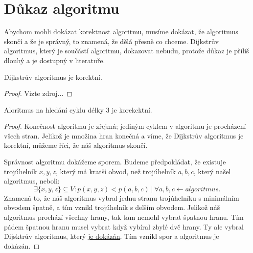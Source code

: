 \section{Důkaz algoritmu}
\label{dukaz_algoritmu}

Abychom mohli dokázat korektnost algoritmu, musíme dokázat, že algoritmus skončí a že je správný, to znamená, že dělá přesně co chceme. Dijkstrův algoritmus, který je součástí algoritmu, dokazovat nebudu, protože důkaz je příliš dlouhý a je dostupný v literatuře.
\begin{tvrzeni}
    \label{tvrzeni:dijkstra}
    Dijkstrův algoritmus je korektní.
\end{tvrzeni}
\begin{proof}
    \label{dukaz:dijkstra}
    Vizte zdroj...\autocite{benlFormalCorrectnessProofs1999}
\end{proof}
\begin{tvrzeni}
    \label{tvrzeni:algoritmus}
    Aloritmus na hledání cyklu délky 3 je korekektní.
\end{tvrzeni}
\begin{proof}
    \label{dukaz:algoritmus}
Konečnost algoritmu je zřejmá; jediným cyklem v algoritmu je procházení všech stran. Jelikož je množina hran konečná a víme, že Dijkstrův algoritmus je korektní, můžeme říci, že náš algoritmus skončí.

Správnost algoritmu dokážeme sporem. Budeme předpokládat, že existuje trojúhelník $x, y, z$, který má kratší obvod, než trojúhelník $a, b, c$, který našel algoritmus, neboli:
\begin{equation*}
    \exists \{x, y, z\}\subseteq V: p(x, y, z) < p(a, b, c)~|~\forall a, b, c \leftarrow algoritmus.
\end{equation*}
Znamená to, že náš algoritmus vybral jednu stranu trojúhelníku s minimálním obvodem špatně, a tím vznikl trojúhelník s delším obvodem. Jelikož náš algoritmus prochází všechny hrany, tak tam nemohl vybrat špatnou hranu. Tím pádem špatnou hranu musel vybrat když vybíral zbylé dvě hrany. Ty ale vybral Dijsktrův algoritmus, který \hyperref[dukaz:dijkstra]{je dokázán}. Tím vznikl spor a algoritmus je dokázán. 
\end{proof}